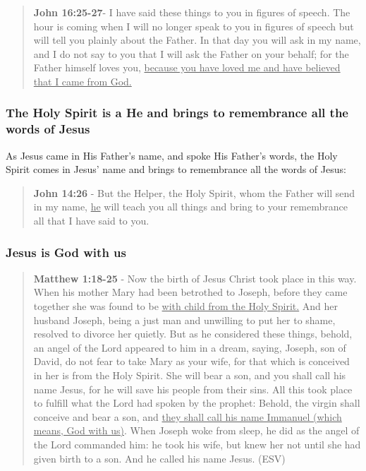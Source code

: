 \documentclass[11pt]{article}
\begin{document}
\begin{quote}
\textbf{John 16:25-27}- I have said these things to you in figures of speech. The hour is coming when I will no longer speak to you in figures of speech but will tell you plainly about the Father. In that day you will ask in my name, and I do not say to you that I will ask the Father on your behalf; for the Father himself loves you, \uline{because you have loved me and have believed that I came from God.}
\end{quote}

\subsubsection{The Holy Spirit is a He and brings to remembrance all the words of Jesus}
\label{sec:org31212a7}
As Jesus came in His Father's name, and spoke His Father's words,
the Holy Spirit comes in Jesus' name and brings to remembrance all the words of Jesus:

\begin{quote}
\textbf{John 14:26} - But the Helper, the Holy Spirit, whom the Father will send in my name, \uline{he} will teach you all things and bring to your remembrance all that I have said to you.
\end{quote}

\subsubsection{Jesus is God with us}
\label{sec:org1c97e84}
\begin{quote}
\textbf{Matthew 1:18-25} - Now the birth of Jesus Christ took place in this way. When his mother Mary had been betrothed to Joseph, before they came together she was found to be \uline{with child from the Holy Spirit.} And her husband Joseph, being a just man and unwilling to put her to shame, resolved to divorce her quietly. But as he considered these things, behold, an angel of the Lord appeared to him in a dream, saying, Joseph, son of David, do not fear to take Mary as your wife, for that which is conceived in her is from the Holy Spirit. She will bear a son, and you shall call his name Jesus, for he will save his people from their sins. All this took place to fulfill what the Lord had spoken by the prophet: Behold, the virgin shall conceive and bear a son, and \uline{they shall call his name Immanuel (which means, God with us)}. When Joseph woke from sleep, he did as the angel of the Lord commanded him: he took his wife, but knew her not until she had given birth to a son. And he called his name Jesus. (ESV)
\end{quote}
\end{document}
